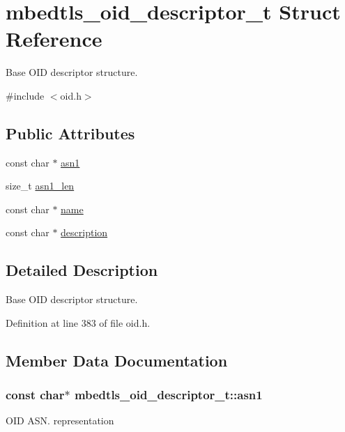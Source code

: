 \hypertarget{structmbedtls__oid__descriptor__t}{\section{mbedtls\-\_\-oid\-\_\-descriptor\-\_\-t Struct Reference}
\label{structmbedtls__oid__descriptor__t}
}


Base O\-I\-D descriptor structure.  




{\ttfamily \#include $<$oid.\-h$>$}

\subsection*{Public Attributes}
\begin{DoxyCompactItemize}
\item 
const char $\ast$ \hyperlink{structmbedtls__oid__descriptor__t_a9a0c9f82eed2f753d0fa0c4727c21ffa}{asn1}
\item 
size\-\_\-t \hyperlink{structmbedtls__oid__descriptor__t_a99525f8a87473843e282f79ee07e5f9f}{asn1\-\_\-len}
\item 
const char $\ast$ \hyperlink{structmbedtls__oid__descriptor__t_a096eb054c65a0735f77c3431097c2aa4}{name}
\item 
const char $\ast$ \hyperlink{structmbedtls__oid__descriptor__t_a5b447674c65045cf4f855bd1c728f109}{description}
\end{DoxyCompactItemize}


\subsection{Detailed Description}
Base O\-I\-D descriptor structure. 

Definition at line 383 of file oid.\-h.



\subsection{Member Data Documentation}
\hypertarget{structmbedtls__oid__descriptor__t_a9a0c9f82eed2f753d0fa0c4727c21ffa}{
\subsubsection[{asn1}]{\setlength{\rightskip}{0pt plus 5cm}const char$\ast$ mbedtls\-\_\-oid\-\_\-descriptor\-\_\-t\-::asn1}}\label{structmbedtls__oid__descriptor__t_a9a0c9f82eed2f753d0fa0c4727c21ffa}
O\-I\-D A\-S\-N. representation 


